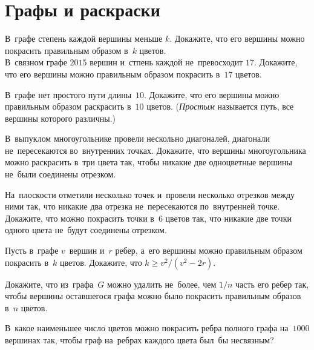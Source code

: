 
\section*{Графы и раскраски}


\begin{problems}

\item
\subproblem
В~графе степень каждой вершины меньше $k$.
Докажите, что его вершины можно покрасить правильным образом в~$k$ цветов.
\\
\subproblem
В~связном графе $2015$ вершин и~стпень каждой не~превосходит $17$.
Докажите, что его вершины можно правильным образом покрасить в~$17$ цветов.

\item
В~графе нет простого пути длины~$10$.
Докажите, что его вершины можно правильным образом раскрасить в~$10$ цветов.
(\emph{Простым} называется путь, все вершины которого различны.)

\item
В~выпуклом многоугольнике провели нескольно диагоналей, диагонали
не~пересекаются во~внутренних точках.
Докажите, что вершины многоугольника можно раскрасить в~три цвета так, чтобы
никакие две одноцветные вершины не~были соединены отрезком.

\item
На~плоскости отметили несколько точек и~провели несколько отрезков между ними
так, что никакие два отрезка не~пересекаются по~внутренней точке.
Докажите, что можно покрасить точки в~$6$ цветов так, что никакие две точки
одного цвета не~будут соединены отрезком.

\item
Пусть в~графе $v$~вершин и~$r$ ребер, а~его вершины можно правильным образом
покрасить в~$k$ цветов.
Докажите, что $k \geq v^2 / (v^2 - 2 r)$.

\item
Докажите, что из~графа~$G$ можно удалить не~более, чем $1 / n$ часть его ребер
так, чтобы вершины оставшегося графа можно было покрасить правильным образов
в~$n$ цветов.

\item
В~какое наименьшее число цветов можно покрасить ребра полного графа на~$1000$
вершинах так, чтобы граф на~ребрах каждого цвета был~бы несвязным?


\end{problems}
